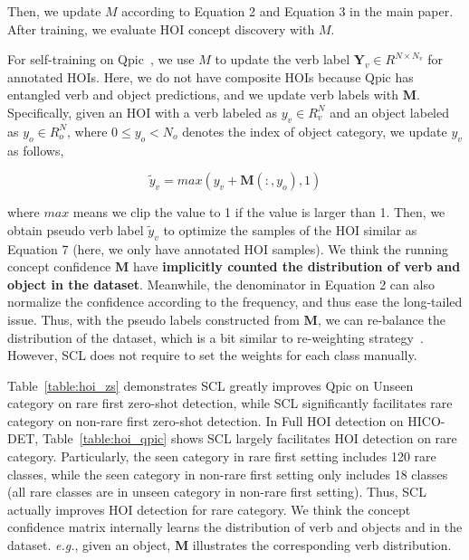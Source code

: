 \documentclass[runningheads]{llncs}
\newcommand{\eg}{\textit{e.g.}}
\begin{document}
Then, we update $M$ according to Equation 2 and Equation 3 in the main paper. After training, we evaluate HOI concept discovery with $M$.

For self-training on Qpic~\cite{tamura_cvpr2021}, we use $M$ to update the verb label $\mathbf{Y}_v\in R^{N\times N_v}$ for annotated HOIs. Here, we do not have composite HOIs because Qpic has entangled verb and object predictions, and we update verb labels with $\mathbf{M}$. Specifically, given an HOI with a verb labeled as $y_v\in R^N_v$ and an object labeled as $y_o \in R^N_o$, where $0\leq y_o < N_o$ denotes the index of object category, we update $y_v$ as follows,

\begin{equation}
\label{eq:qpic_pred1}
\widetilde{y}_v = max(y_v+\mathbf{M}(:, y_o), 1)
\end{equation}

where $max$ means we clip the value to 1 if the value is larger than 1. Then, we obtain pseudo verb label $\widetilde{y}_v$ to optimize the samples of the HOI similar as Equation 7 (here, we only have annotated HOI samples). We think the running concept confidence $\mathbf{M}$ have {\bf implicitly counted the distribution of verb and object in the dataset}. Meanwhile, the denominator in Equation 2 can also normalize the confidence according to the frequency, and thus ease the long-tailed issue. Thus, with the pseudo labels constructed from $\mathbf{M}$, we can re-balance the distribution of the dataset, which is a bit similar to re-weighting strategy~\cite{byrd2019effect,cui2019class}. However, SCL does not require to set the weights for each class manually.

Table~\ref{table:hoi_zs} demonstrates SCL greatly improves Qpic on Unseen category on rare first zero-shot detection, while SCL significantly facilitates rare category on non-rare first zero-shot detection. In Full HOI detection on HICO-DET, Table~\ref{table:hoi_qpic} shows SCL largely facilitates HOI detection on rare category. Particularly, the seen category in rare first setting includes 120 rare classes, while the seen category in non-rare first setting only includes 18 classes (all rare classes are in unseen category in non-rare first setting). Thus, SCL actually improves HOI detection for rare category. We think the concept confidence matrix internally learns the distribution of verb and objects and in the dataset. \eg, given an object, $\mathbf{M}$ illustrates the corresponding verb distribution.
\end{document}
